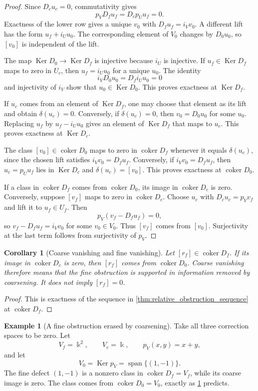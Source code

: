 \documentclass[11pt,a4paper]{article}
\theoremstyle{plain}
\newtheorem{corollary}[corollary]{Corollary}
\theoremstyle{definition}
\newtheorem{example}[example]{Example}
\theoremstyle{remark}
\newcommand{\bbk}{\Bbbk}
\newcommand{\Ker}{\operatorname{Ker}}
\newcommand{\coker}{\operatorname{coker}}
\newcommand{\Span}{\operatorname{span}}
\begin{document}
\begin{proof}
Since $D_cu_c=0$, commutativity gives
\[
p_VD_fu_f=D_cp_Uu_f=0.
\]
Exactness of the lower row gives a unique $v_0$ with $D_fu_f=i_Vv_0$.  A different lift has the form $u_f+i_Uu_0$.  The corresponding element of $V_0$ changes by $D_0u_0$, so $[v_0]$ is independent of the lift.

The map $\Ker D_0\to\Ker D_f$ is injective because $i_U$ is injective.  If $u_f\in\Ker D_f$ maps to zero in $U_c$, then $u_f=i_Uu_0$ for a unique $u_0$.  The identity
\[
i_VD_0u_0=D_fi_Uu_0=0
\]
and injectivity of $i_V$ show that $u_0\in\Ker D_0$.  This proves exactness at $\Ker D_f$.

If $u_c$ comes from an element of $\Ker D_f$, one may choose that element as its lift and obtain $\delta(u_c)=0$.  Conversely, if $\delta(u_c)=0$, then $v_0=D_0u_0$ for some $u_0$.  Replacing $u_f$ by $u_f-i_Uu_0$ gives an element of $\Ker D_f$ that maps to $u_c$.  This proves exactness at $\Ker D_c$.

The class $[v_0]\in\coker D_0$ maps to zero in $\coker D_f$ whenever it equals $\delta(u_c)$, since the chosen lift satisfies $i_Vv_0=D_fu_f$.  Conversely, if $i_Vv_0=D_fu_f$, then $u_c=p_Uu_f$ lies in $\Ker D_c$ and $\delta(u_c)=[v_0]$.  This proves exactness at $\coker D_0$.

If a class in $\coker D_f$ comes from $\coker D_0$, its image in $\coker D_c$ is zero.  Conversely, suppose $[v_f]$ maps to zero in $\coker D_c$.  Choose $u_c$ with $D_cu_c=p_Vv_f$ and lift it to $u_f\in U_f$.  Then
\[
p_V(v_f-D_fu_f)=0,
\]
so $v_f-D_fu_f=i_Vv_0$ for some $v_0\in V_0$.  Thus $[v_f]$ comes from $[v_0]$.  Surjectivity at the last term follows from surjectivity of $p_V$.
\end{proof}

\begin{corollary}[Coarse vanishing and fine vanishing]\label{cor:coarse_fine_obstruction}
Let $[r_f]\in\coker D_f$.  If its image in $\coker D_c$ is zero, then $[r_f]$ comes from $\coker D_0$.  Coarse vanishing therefore means that the fine obstruction is supported in information removed by coarsening.  It does not imply $[r_f]=0$.
\end{corollary}

\begin{proof}
This is exactness of the sequence in \cref{thm:relative_obstruction_sequence} at $\coker D_f$.
\end{proof}

\begin{example}[A fine obstruction erased by coarsening]\label{ex:coarse_cancellation}
Take all three correction spaces to be zero.  Let
\[
V_f=\bbk^2,
\qquad
V_c=\bbk,
\qquad
p_V(x,y)=x+y,
\]
and let
\[
V_0=\Ker p_V=\Span\{(1,-1)\}.
\]
The fine defect $(1,-1)$ is a nonzero class in $\coker D_f=V_f$, while its coarse image is zero.  The class comes from $\coker D_0=V_0$, exactly as \cref{cor:coarse_fine_obstruction} predicts.
\end{example}
\end{document}
